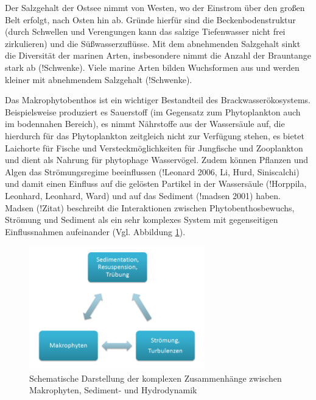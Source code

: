 Der Salzgehalt der Ostsee nimmt von Westen, wo der Einstrom über den großen Belt erfolgt, nach Osten hin ab. Gründe hierfür sind die Beckenbodenstruktur (durch Schwellen und Verengungen kann das salzige Tiefenwasser nicht frei zirkulieren) und die Süßwasserzuflüsse. Mit dem abnehmenden Salzgehalt sinkt die Diversität der marinen Arten, insbesondere nimmt die Anzahl der Brauntange stark ab (!Schwenke). Viele marine Arten bilden Wuchsformen aus und werden kleiner mit abnehmendem Salzgehalt (!Schwenke).

Das Makrophytobenthos ist ein wichtiger Bestandteil des Brackwasserökosystems. Beispielsweise produziert es Sauerstoff (im  Gegensatz zum Phytoplankton auch im bodennahen Bereich), es nimmt Nährstoffe aus der Wassersäule auf, die hierdurch für das Phytoplankton zeitgleich nicht zur Verfügung stehen, es bietet Laichorte für Fische und Versteckmöglichkeiten für Jungfische und Zooplankton und dient als Nahrung für phytophage Wasservögel.
Zudem können Pflanzen und Algen das Strömungsregime beeinflussen (!Leonard 2006, Li, Hurd, Siniscalchi) und damit einen Einfluss auf die gelösten Partikel in der Wassersäule (!Horppila, Leonhard, Leonhard, Ward) und auf das Sediment (!madsen 2001) haben. Madsen (!Zitat) beschreibt die Interaktionen zwischen Phytobenthosbewuchs, Strömung und Sediment als ein sehr komplexes System mit gegenseitigen Einflussnahmen aufeinander (Vgl. Abbildung \ref{fig:schema_Makrophyten,Sedimente,Hydrodynamik}).


\begin{figure}[htb]
\centering
\includegraphics[width=0.68\textwidth]{images/Schema_Pfl_Sedim_Strm}
\caption[Zusammenhänge zwischen Makrophyten, Sediment- und Hydrodynamik]{Schematische Darstellung der komplexen Zusammenhänge zwischen Makrophyten, Sediment- und Hydrodynamik}
\label{fig:schema_Makrophyten,Sedimente,Hydrodynamik}
\end{figure}


